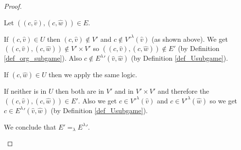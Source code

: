 \begin{lemma}
\begin{proof}
\begin{enumerate}
			Let $((c,\hat{v}),(c,\hat{w})) \in E$.
			
			If $(c,\hat{v}) \in U$ then $(c,\hat{v}) \notin V'$ and $c \notin {V'}^\lambda(\hat{v})$ (as shown above). We get $((c,\hat{v}),(c,\hat{w})) \notin V' \times V'$ so $((c,\hat{v}),(c,\hat{w})) \notin E'$ (by Definition \ref{def_org_subgame}). Also $c \notin {E^\lambda}'(\hat{v},\hat{w})$ (by Definition \ref{def_Usubgame}).
			
			If $(c,\hat{w}) \in U$ then we apply the same logic.
			
			If neither is in $U$ then both are in $V'$ and in $V' \times V'$ and therefore the $((c,\hat{v}),(c,\hat{w})) \in E'$. Also we get $c \in {V'}^\lambda(\hat{v})$ and $c \in {V'}^\lambda(\hat{w})$ so we get $c \in {E^\lambda}'(\hat{v},\hat{w})$ (by Definition \ref{def_Usubgame}).
			
			We conclude that $E' =_\lambda {E^\lambda}'$.
		\end{enumerate}
	\end{proof}
\end{lemma}

